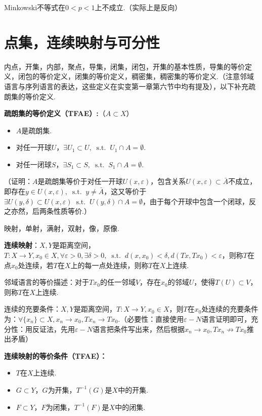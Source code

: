 \documentclass[bwprint, withoutpreface]{cumcmthesis}
\newcommand*{\st}{\mathop{}\!\mathrm{s.t.}\!\mathop{}}
\begin{document}
Minkowski不等式在$0 < p < 1$上不成立.（实际上是反向）

\section{点集，连续映射与可分性}
内点，开集，内部，聚点，导集，闭集，闭包，开集的基本性质，导集的等价定义，闭包的等价定义，闭集的等价定义，稠密集，稠密集的等价定义.（注意邻域语言与序列语言的表达，这些定义在实变第一章第六节中均有提及），以下补充疏朗集的等价定义.

\textbf{疏朗集的等价定义（TFAE）:}（$A \subset X$）
\begin{itemize}[itemindent=2em]
	\item $A$是疏朗集.
	\item 对任一开球$U$，$\exists U_1 \subset U, \st U_1 \cap A = \emptyset$.
	\item 对任一闭球$S$，$\exists S_1 \subset S, \st S_1 \cap A = \emptyset$.
\end{itemize}

（证明：$A$是疏朗集等价于对任一开球$U(x, \varepsilon)$，包含关系$U(x, \varepsilon) \subset \bar{A}$不成立，即存在$y \in U(x, \varepsilon), \st y \neq \bar{A}$，这又等价于$\exists U(y, \delta) \subset U(x, \varepsilon) \st U(y, \delta) \cap A = \emptyset$，由于每个开球中包含一个闭球，反之亦然，后两条性质等价.）

映射，单射，满射，双射，像，原像.

\textbf{连续映射}：$X, Y$是距离空间，$T:X \to Y, x_0 \in X, \forall \varepsilon > 0, \exists \delta > 0, \st d(x, x_0) < \delta, d(Tx, Tx_0) < \varepsilon$，则称$T$在点$x_0$处连续，若$T$在$X$上的每一点处连续，则称$T$在$X$上连续.

邻域语言的等价描述：对于$Tx_0$的任一邻域$V$，存在$x_0$的邻域$U$，使得$T(U) \subset V$，则称$T$在$X$上连续.

连续的充要条件：$X, Y$是距离空间，$T:X \to Y, x_0 \in X$，则$T$在$x_0$处连续的充要条件为：$\forall \{x_n\} \subset X, x_n \to x_0, Tx_n \to Tx_0$.（必要性：直接使用$\varepsilon-N$语言证明即可，充分性：用反证法，先用$\varepsilon-N$语言把条件写出来，然后根据$x_n \to x_0, Tx_n \nrightarrow Tx_0$推出矛盾）

\textbf{连续映射的等价条件（TFAE）：}
\begin{itemize}
	\item $T$在$X$上连续.
	\item $G \subset Y$，$G$为开集，$T^{-1}(G)$是$X$中的开集.
	\item $F \subset Y$，$F$为闭集，$T^{-1}(F)$是$X$中的闭集.
\end{itemize}
\end{document}
